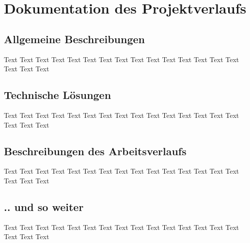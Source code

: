 \chapter{Dokumentation des Projektverlaufs}
\section{Allgemeine Beschreibungen}
Text Text Text Text Text Text Text Text Text Text Text Text Text Text Text Text Text Text
\section{Technische L\"osungen}
Text Text Text Text Text Text Text Text Text Text Text Text Text Text Text Text Text Text
\section{Beschreibungen des Arbeitsverlaufs}
Text Text Text Text Text Text Text Text Text Text Text Text Text Text Text Text Text Text
\section{.. und so weiter}
Text Text Text Text Text Text Text Text Text Text Text Text Text Text Text Text Text Text